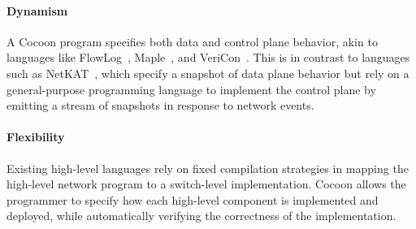 \documentclass[letterpaper,10pt,twocolumn]{article}
\begin{document}

\paragraph{Dynamism} A Cocoon program specifies both data and 
control plane behavior, akin to languages like 
FlowLog~\cite{Nelson_FSK_14}, Maple~\cite{Voellmy_WYFH_13}, and 
VeriCon~\cite{Ball_BGIKSSV_14}.  This is in contrast to languages 
such as NetKAT~\cite{Anderson_FGJKSW_14}, which specify a snapshot 
of data plane behavior but rely on a general-purpose programming 
language to implement the control plane by emitting a stream of 
snapshots in response to network events.


\paragraph{Flexibility} Existing high-level languages rely on 
fixed compilation strategies in mapping the high-level network 
program to a switch-level implementation.  Cocoon allows the 
programmer to specify how each high-level component is implemented 
and deployed, while automatically verifying the correctness of the 
implementation.



\vspace{2mm}
\end{document}
